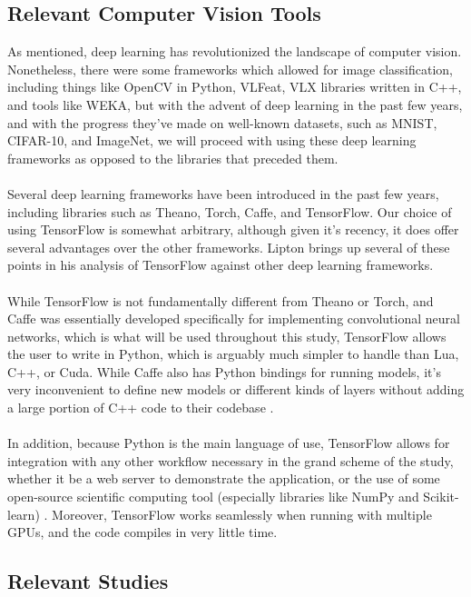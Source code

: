\documentclass{article}
\begin{document}
\subsection{Relevant Computer Vision Tools}

As mentioned, deep learning has revolutionized the landscape of computer vision. Nonetheless, there were some frameworks which allowed for image classification, including things like OpenCV in Python, VLFeat, VLX libraries written in C++, and tools like WEKA, but with the advent of deep learning in the past few years, and with the progress they've made on well-known datasets, such as MNIST, CIFAR-10, and ImageNet, we will proceed with using these deep learning frameworks as opposed to the libraries that preceded them.
\\ \\
Several deep learning frameworks have been introduced in the past few years, including libraries such as Theano, Torch, Caffe, and TensorFlow. Our choice of using TensorFlow is somewhat arbitrary, although given it's recency, it does offer several advantages over the other frameworks. Lipton brings up several of these points in his analysis of TensorFlow against other deep learning frameworks.
\\ \\
While TensorFlow is not fundamentally different from Theano or Torch, and Caffe was essentially developed specifically for implementing convolutional neural networks, which is what will be used throughout this study, TensorFlow allows the user to write in Python, which is arguably much simpler to handle than Lua, C++, or Cuda. While Caffe also has Python bindings for running models, it's very inconvenient to define new models or different kinds of layers without adding a large portion of C++ code to their codebase \cite{lipton15}.
\\ \\
In addition, because Python is the main language of use, TensorFlow allows for integration with any other workflow necessary in the grand scheme of the study, whether it be a web server to demonstrate the application, or the use of some open-source scientific computing tool (especially libraries like NumPy and Scikit-learn) \cite{lipton15}. Moreover, TensorFlow works seamlessly when running with multiple GPUs, and the code compiles in very little time. 

\subsection{Relevant Studies}
\end{document}
